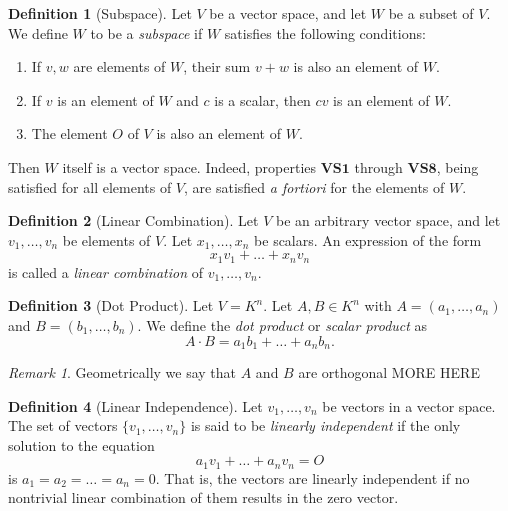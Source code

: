 \documentclass{article}
\theoremstyle{definition}
\newtheorem{definition}{Definition}[section]
\theoremstyle{remark}
\newtheorem{remark}{Remark}[section]
\begin{document}
\begin{definition}[Subspace]
Let $V$ be a vector space, and let $W$ be a subset of $V$. We define $W$ to be a \textit{subspace} if $W$ satisfies the following conditions:
\begin{enumerate}
\item If $v, w$ are elements of $W$, their sum $v + w$ is also an element of $W$.
\item If $v$ is an element of $W$ and $c$ is a scalar, then $cv$ is an element of $W$.
\item The element $O$ of $V$ is also an element of $W$.
\end{enumerate}
Then $W$ itself is a vector space. Indeed, properties $\textbf{VS1}$ through $\textbf{VS8}$, being satisfied for all elements of $V$, are satisfied \textit{a fortiori} for the elements of $W$.
\end{definition}





\begin{definition}[Linear Combination]
Let $V$ be an arbitrary vector space, and let $v_1, \dots, v_n$ be elements of $V$. Let $x_1, \dots, x_n$ be scalars. An expression of the form
\[
x_1 v_1 + \dots + x_n v_n
\]
is called a \textit{linear combination} of $v_1, \dots, v_n$.
\end{definition}


\begin{definition}[Dot Product]
Let $V = K^n$. Let $A, B \in K^n$ with $A = (a_1, \dots, a_n)$ and $B = (b_1, \dots, b_n)$. We define the \textit{dot product} or \textit{scalar product} as
\[
A \cdot B = a_1 b_1 + \dots + a_n b_n.
\]
\end{definition}

\begin{remark}
Geometrically we say that $A$ and $B$ are orthogonal
MORE HERE
\end{remark}



\begin{definition}[Linear Independence]
Let $v_1, \dots, v_n$ be vectors in a vector space. The set of vectors $\{ v_1, \dots, v_n \}$ is said to be \textit{linearly independent} if the only solution to the equation
\[
a_1 v_1 + \dots + a_n v_n = O
\]
is $a_1 = a_2 = \dots = a_n = 0$. That is, the vectors are linearly independent if no nontrivial linear combination of them results in the zero vector.
\end{definition}
\end{document}
